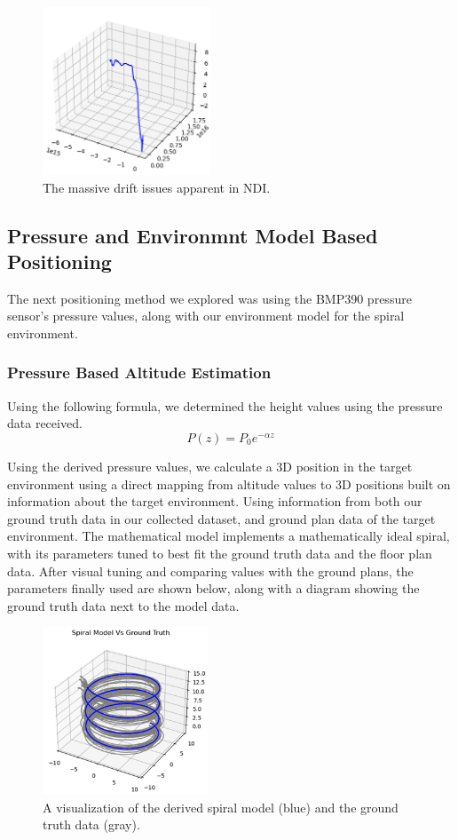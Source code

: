 \begin{figure}[h] 
	\centering \includegraphics[height=5cm]{./images/ndi.png}
	\caption{The massive drift issues apparent in NDI.}
\end{figure}

\subsection{Pressure and Environmnt Model Based Positioning}
The next positioning method we explored was using the BMP390 pressure sensor's pressure values, along with our environment model for the spiral environment.
\subsubsection{Pressure Based Altitude Estimation}
Using the following formula, we determined the height values using the pressure data received.
$$P\left(z\right)=P_0e^{-\alpha z}$$

Using the derived pressure values, we calculate a 3D position in the target environment using a direct mapping from altitude values to 3D positions built on information about the target environment. Using information from both our ground truth data in our collected dataset, and ground plan data of the target environment. The mathematical model implements a mathematically ideal spiral, with its parameters tuned to best fit the ground truth data and the floor plan data. After visual tuning and comparing values with the ground plans, the parameters finally used are shown below, along with a diagram showing the ground truth data next to the model data.

\begin{figure}[h] 
	\centering \includegraphics[height=5cm]{./images/spiralmodel.png}
	\caption{A visualization of the derived spiral model (blue) and the ground truth data (gray).}
\end{figure}

